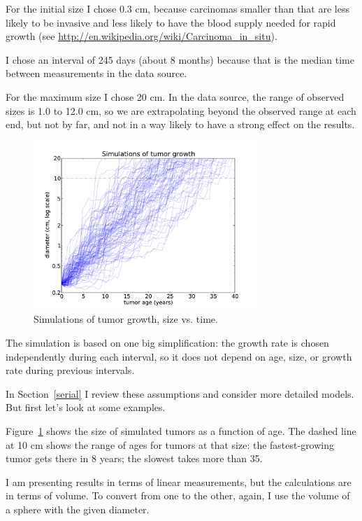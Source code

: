 \documentclass[12pt]{book}
\theoremstyle{exercise}
\begin{document}
For the initial size I chose 0.3 cm, because carcinomas smaller than
that are less likely to be invasive and less likely to have the blood
supply needed for rapid growth (see
\url{http://en.wikipedia.org/wiki/Carcinoma_in_situ}).  

I chose an interval of 245 days (about 8 months) because that is the
median time between measurements in the data source.

For the maximum size I chose 20 cm.  In the data source, the range of
observed sizes is 1.0 to 12.0 cm, so we are extrapolating beyond
the observed range at each end, but not by far, and not in a way
likely to have a strong effect on the results.

\begin{figure}
\centerline{\includegraphics[height=2.5in]{figs/kidney4.pdf}}
\caption{Simulations of tumor growth, size vs. time.}
\label{fig.kidney4}
\end{figure}

The simulation is based on one big simplification:
the growth rate is chosen independently during each interval,
so it does not depend on age, size, or growth rate during
previous intervals.

In Section~\ref{serial} I review these assumptions and
consider more detailed models.  But first let's look at some
examples.

Figure~\ref{fig.kidney4} shows 
the size of simulated tumors as a function of
age.  The dashed line at 10 cm shows the range of ages for tumors at
that size: the fastest-growing tumor gets there in 8 years; the
slowest takes more than 35.

I am presenting results in terms of linear measurements, but the
calculations are in terms of volume.  To convert from one to the
other, again, I use the volume of a sphere with the given
diameter.
\end{document}
